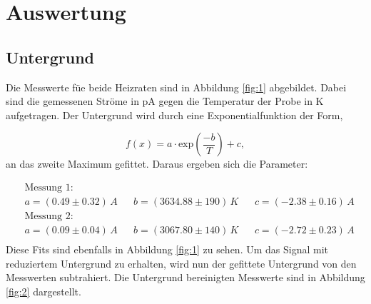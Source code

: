 \newpage
\section{Auswertung}
\label{sec:Auswertung}

\subsection{Untergrund}
\label{sec:Untergrund}
Die Messwerte füe beide Heizraten sind in Abbildung \ref{fig:1} abgebildet. 
Dabei sind die gemessenen Ströme in pA gegen die Temperatur der Probe in K aufgetragen.
Der Untergrund wird durch eine Exponentialfunktion der Form,

\begin{equation}
    f(x) = a \cdot \text{exp} \left( \frac{-b}{T} \right) + c,
\end{equation}
an das zweite Maximum gefittet.
Daraus ergeben sich die Parameter: 

\begin{align*}
    &\text{Messung 1:}\\
    & a = (0.49 \pm 0.32) \,A    &&  b = (3634.88 \pm 190) \,K    &&  c = (-2.38 \pm 0.16 )\,A \\
    &\text{Messung 2:}\\
    & a = (0.09 \pm 0.04) \,A    &&  b = (3067.80 \pm 140) \,K    &&  c = (-2.72 \pm 0.23 )\,A \\
\end{align*}
Diese Fits sind ebenfalls in Abbildung \ref{fig:1} zu sehen.
Um das Signal mit reduziertem Untergrund zu erhalten, wird nun der gefittete Untergrund von den Messwerten subtrahiert.
Die Untergrund bereinigten Messwerte sind in Abbildung \ref{fig:2} dargestellt.

